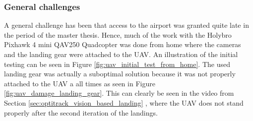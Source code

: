 \documentclass[../Head/report.tex]{subfiles}
\begin{document}
\subsubsection*{General challenges}

A general challenge has been that access to the airport was granted quite late in the period of the master thesis. Hence, much of the work with the Holybro Pixhawk 4 mini QAV250 Quadcopter was done from home where the cameras and the landing gear were attached to the UAV. An illustration of the initial testing can be seen in Figure \ref{fig:uav_initial_test_from_home}. The used landing gear was actually a suboptimal solution because it was not properly attached to the UAV a all times as seen in Figure \ref{fig:uav_damage_landing_gear}. This can clearly be seen in the video from Section \ref{sec:optitrack_vision_based_landing} , where the UAV does not stand properly after the second iteration of the landings.  
\end{document}

